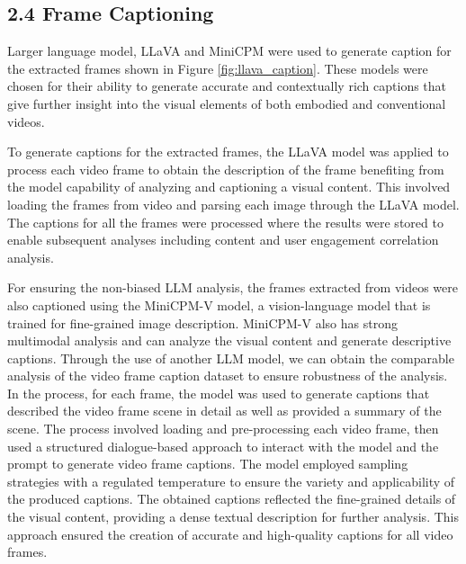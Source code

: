 \documentclass[12pt]{article}
\begin{document}
\subsection*{2.4 Frame Captioning}
 Larger language model, LLaVA and MiniCPM were used to generate caption for the extracted frames shown in Figure \ref{fig:llava_caption}. These models were chosen for their ability to generate accurate and contextually rich captions that give further insight into the visual elements of both embodied and conventional videos. 


To generate captions for the extracted frames, the LLaVA model was applied to process each video frame to obtain the description of the frame benefiting from the model capability of analyzing and captioning a visual content. This involved loading the frames from video and parsing each image through the LLaVA model. The captions for all the frames were processed where the results were stored  to enable subsequent analyses including content and user engagement correlation analysis. 

For ensuring the non-biased LLM analysis, the frames extracted from videos were also captioned using the MiniCPM-V model, a vision-language model that is trained for fine-grained image description. MiniCPM-V also has strong multimodal analysis and can analyze the visual content and generate descriptive captions. Through the use of another LLM model, we can obtain the comparable analysis of the video frame caption dataset to ensure robustness of the analysis. In the process, for each frame, the model was used to generate captions that described the video frame scene in detail as well as provided a summary of the scene. The process involved loading and pre-processing each video frame, then used a structured dialogue-based approach to interact with the model and the prompt to generate video frame captions. The model employed sampling strategies with a regulated temperature to ensure the variety and applicability of the produced captions. The obtained captions reflected the fine-grained details of the visual content, providing a dense textual description for further analysis. This approach ensured the creation of accurate and high-quality captions for all video frames.\\
\end{document}
